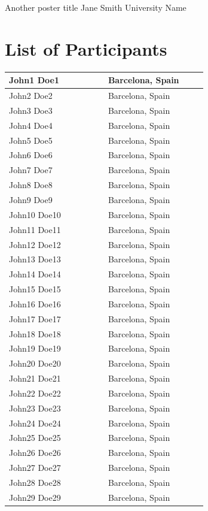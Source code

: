 \documentclass[
	openany, %
	parskip=full, %
	12pt, %
	a4paper, %
]{conferencebooklet} %
\begin{document}
\poster
	{Another poster title} %
	{Jane Smith} %
	{University Name} %


\chapter{List of Participants}

\begingroup
	\begin{longtable}{p{0.4\linewidth} p{0.4\linewidth}}
		\hline
		John1 Doe1 & Barcelona, Spain \\ \hline
		John2 Doe2 & Barcelona, Spain \\ \hline
		John3 Doe3 & Barcelona, Spain \\ \hline
		John4 Doe4 & Barcelona, Spain \\ \hline
		John5 Doe5 & Barcelona, Spain \\ \hline
		John6 Doe6 & Barcelona, Spain \\ \hline
		John7 Doe7 & Barcelona, Spain \\ \hline
		John8 Doe8 & Barcelona, Spain \\ \hline
		John9 Doe9 & Barcelona, Spain \\ \hline
		John10 Doe10 & Barcelona, Spain \\ \hline
		John11 Doe11 & Barcelona, Spain \\ \hline
		John12 Doe12 & Barcelona, Spain \\ \hline
		John13 Doe13 & Barcelona, Spain \\ \hline
		John14 Doe14 & Barcelona, Spain \\ \hline
		John15 Doe15 & Barcelona, Spain \\ \hline
		John16 Doe16 & Barcelona, Spain \\ \hline
		John17 Doe17 & Barcelona, Spain \\ \hline
		John18 Doe18 & Barcelona, Spain \\ \hline
		John19 Doe19 & Barcelona, Spain \\ \hline
		John20 Doe20 & Barcelona, Spain \\ \hline
		John21 Doe21 & Barcelona, Spain \\ \hline
		John22 Doe22 & Barcelona, Spain \\ \hline
		John23 Doe23 & Barcelona, Spain \\ \hline
		John24 Doe24 & Barcelona, Spain \\ \hline
		John25 Doe25 & Barcelona, Spain \\ \hline
		John26 Doe26 & Barcelona, Spain \\ \hline
		John27 Doe27 & Barcelona, Spain \\ \hline
		John28 Doe28 & Barcelona, Spain \\ \hline
		John29 Doe29 & Barcelona, Spain \\ \hline
	\end{longtable}
\endgroup
 
\end{document}
